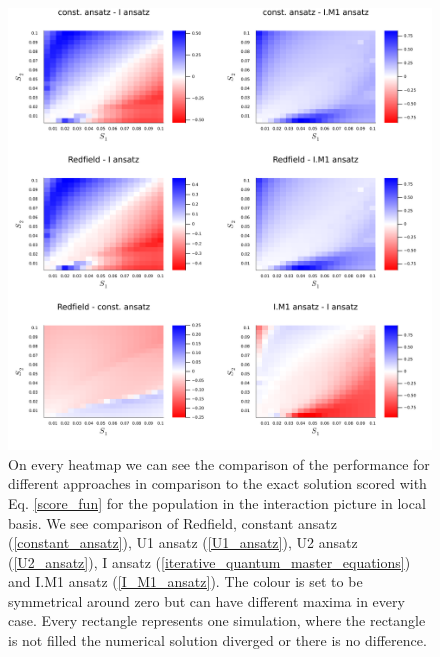 \newpage
\begin{figure}[H]
\centering
\includegraphics[width=1.0\textwidth]{img/scans/hr_scan_2_scorediff_intloc22.png}
\caption{On every heatmap we can see the comparison of the performance for different approaches in comparison to the exact solution scored with Eq. \ref{score_fun} for the population in the interaction picture in local basis. We see comparison of Redfield, constant ansatz (\ref{constant_ansatz}), U1 ansatz (\ref{U1_ansatz}), U2 ansatz (\ref{U2_ansatz}), I ansatz (\ref{iterative_quantum_master_equations}) and I.M1 ansatz (\ref{I_M1_ansatz}). The colour is set to be symmetrical around zero but can have different maxima in every case. Every rectangle represents one simulation, where the rectangle is not filled the numerical solution diverged or there is no difference.}
\label{img:hr_scan_2_scorediff_intloc22}
\end{figure}

